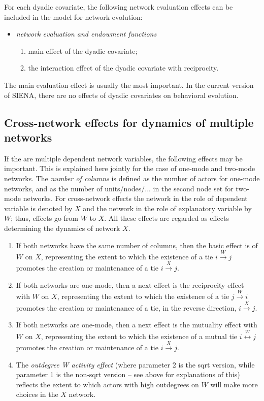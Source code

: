 \documentclass[a4paper,fleqn]{article}
\newcommand{\+}{\, + \,}
\newcommand{\si}{{\sf SIENA}}
\begin{document}
{For each dyadic covariate, the following network evaluation effects
can be included in the model for network evolution:
\begin{itemize}
\item {\em network evaluation and endowment functions}
\begin{enumerate}
\item main effect of the dyadic covariate;
\item the interaction
effect of the dyadic covariate with reciprocity.
\end{enumerate}
\end{itemize}
The main evaluation effect is usually the most important. In the
current version of \si, there are no effects of dyadic covariates
on behavioral evolution.

\subsection{Cross-network effects for dynamics of multiple networks}

If the are multiple dependent network variables,
the following effects may be important.
This is explained here jointly for the case of one-mode and two-mode
networks. The \emph{number of columns} is defined as the number of actors
for one-mode networks, and as the number of units/nodes/...
in the second node set for two-mode networks.
For cross-network effects the network in the role of dependent variable
is denoted by $X$ and the network in the role of explanatory variable
by $W$; thus, effects go from $W$ to $X$.
All these effects are regarded as effects determining the dynamics of network $X$.

\begin{enumerate}
\item If both networks have the same number of columns,
      then the basic effect is of $W$ on  $X$,
      representing the extent to which the existence of a tie
      $i \stackrel{W}{\rightarrow} j$ promotes
      the creation or maintenance of a tie $i \stackrel{X}{\rightarrow} j$.
\item If both networks are one-mode,
      then a next effect is the reciprocity effect with $W$ on  $X$,
      representing the extent to which the existence of a tie
      $j \stackrel{W}{\rightarrow} i$ promotes
      the creation or maintenance of a tie,
      in the reverse direction, $i \stackrel{X}{\rightarrow} j$.
\item If both networks are one-mode,
      then a next effect is the mutuality effect with $W$ on  $X$,
      representing the extent to which the existence of a mutual tie
      $i \stackrel{W}{\leftrightarrow} j$ promotes
      the creation or maintenance of a tie $i \stackrel{X}{\rightarrow} j$.
\item The \emph{outdegree W activity effect} (where parameter 2 is
    the sqrt version, while parameter 1 is the non-sqrt version -- see above
    for explanations of this) reflects the extent to which actors
    with high outdegrees on $W$ will make more choices in the
    $X$ network.


\end{enumerate}}
\end{document}
